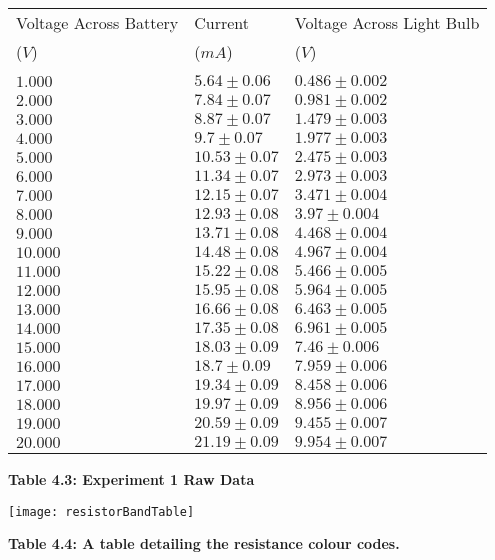 \documentclass[
	letterpaper, %
	10pt, %
]{CSUniSchoolLabReport}
\begin{document}
\begin{center}
	\begin{tabular}{ | l | l | l | }
		\hline
		Voltage Across Battery&Current& Voltage Across Light Bulb\\
		($V$) & ($mA$) & ($V$)\\
		 & & \\
		\hline
		$1.000$&$5.64\pm0.06$&$0.486\pm0.002$\\
		$2.000$&$7.84\pm0.07$&$0.981\pm0.002$\\
		$3.000$&$8.87\pm0.07$&$1.479\pm0.003$\\
		$4.000$&$9.7\pm0.07$&$1.977\pm0.003$\\
		$5.000$&$10.53\pm0.07$&$2.475\pm0.003$\\
		$6.000$&$11.34\pm0.07$&$2.973\pm0.003$\\
		$7.000$&$12.15\pm0.07$&$3.471\pm0.004$\\
		$8.000$&$12.93\pm0.08$&$3.97\pm0.004$\\
		$9.000$&$13.71\pm0.08$&$4.468\pm0.004$\\
		$10.000$&$14.48\pm0.08$&$4.967\pm0.004$\\
		$11.000$&$15.22\pm0.08$&$5.466\pm0.005$\\
		$12.000$&$15.95\pm0.08$&$5.964\pm0.005$\\
		$13.000$&$16.66\pm0.08$&$6.463\pm0.005$\\
		$14.000$&$17.35\pm0.08$&$6.961\pm0.005$\\
		$15.000$&$18.03\pm0.09$&$7.46\pm0.006$\\
		$16.000$&$18.7\pm0.09$&$7.959\pm0.006$\\
		$17.000$&$19.34\pm0.09$&$8.458\pm0.006$\\
		$18.000$&$19.97\pm0.09$&$8.956\pm0.006$\\
		$19.000$&$20.59\pm0.09$&$9.455\pm0.007$\\
		$20.000$&$21.19\pm0.09$&$9.954\pm0.007$\\
		\hline
	\end{tabular}
\end{center}
\begin{center}
    \textbf{Table 4.3: Experiment 1 Raw Data}\\
\end{center}

\begin{center}
	\texttt{[image: resistorBandTable]}
\end{center}
\begin{center}
    \textbf{Table 4.4: A table detailing the resistance colour codes.}\\
\end{center}
\end{document}
